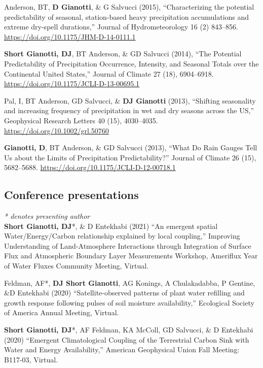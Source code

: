\documentclass[10pt, a4paper]{article}
\renewcommand{\emph}[1]{\textit{#1}}
\newcommand{\lbr}{\vspace*{12pt}}
\newcommand{\years}[1]{\mbox{}\marginnote{\scriptsize #1}} %
\begin{document}
\years{2015a}Anderson, BT, \textbf{D Gianotti}, \& G Salvucci (2015), ``Characterizing the potential predictability of seasonal, station-based heavy precipitation accumulations and extreme dry-spell durations,'' Journal of Hydrometeorology 16 (2) 843--856. \url{https://doi.org/10.1175/JHM-D-14-0111.1} \lbr

\years{2014a}\textbf{Short Gianotti, DJ}, BT Anderson, \& GD Salvucci (2014), ``The Potential Predictability of Precipitation Occurrence, Intensity, and Seasonal Totals over the Continental United States,'' Journal of Climate 27 (18), 6904--6918. \url{https://doi.org/10.1175/JCLI-D-13-00695.1} \lbr

\years{2013b}Pal, I, BT Anderson, GD Salvucci, \& \textbf{DJ Gianotti} (2013), ``Shifting seasonality and increasing frequency of precipitation in wet and dry seasons across the US,'' Geophysical Research Letters 40 (15), 4030--4035. \url{https://doi.org/10.1002/grl.50760} \lbr

\years{2013a}\textbf{Gianotti, D}, BT Anderson, \& GD Salvucci (2013), ``What Do Rain Gauges Tell Us about the Limits of Precipitation Predictability?'' Journal of Climate 26 (15), 5682--5688. \url{https://doi.org/10.1175/JCLI-D-12-00718.1} \lbr

\subsection*{Conference presentations}
\emph{* denotes presenting author} \\

\noindent
\years{2021}\textbf{Short Gianotti, DJ}*, \& D Entekhabi (2021) ``An emergent spatial Water/Energy/Carbon relationship explained by local coupling,'' Improving Understanding of Land-Atmosphere Interactions through Integration of Surface Flux and Atmospheric Boundary Layer Measurements Workshop, Ameriflux Year of Water Fluxes Community Meeting, Virtual.\lbr %

\years{2020}Feldman, AF*, \textbf{DJ Short Gianotti}, AG Konings, A Chulakadabba, P Gentine, \&D Entekhabi (2020) ``Satellite-observed patterns of plant water refilling and growth response following pulses of soil moisture availability,'' Ecological Society of America Annual Meeting, Virtual.\lbr %

\years{2020}\textbf{Short Gianotti, DJ}*, AF Feldman, KA McColl, GD Salvucci, \& D Entekhabi (2020) ``Emergent Climatological Coupling of the Terrestrial Carbon Sink with Water and Energy Availability,'' American Geophysical Union Fall Meeting: B117-03, Virtual.\lbr
\end{document}
